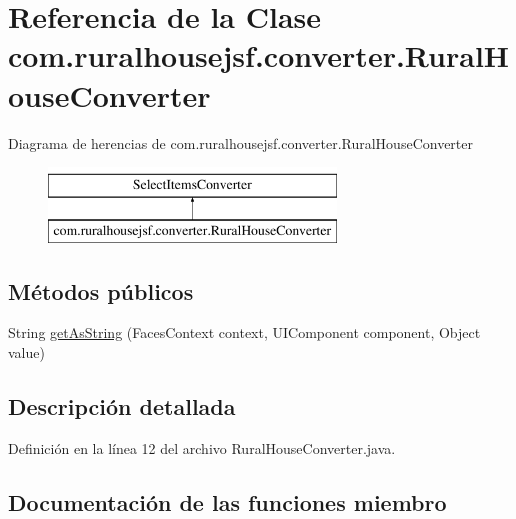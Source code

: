 \hypertarget{classcom_1_1ruralhousejsf_1_1converter_1_1_rural_house_converter}{}\section{Referencia de la Clase com.\+ruralhousejsf.\+converter.\+Rural\+House\+Converter}
\label{classcom_1_1ruralhousejsf_1_1converter_1_1_rural_house_converter}
Diagrama de herencias de com.\+ruralhousejsf.\+converter.\+Rural\+House\+Converter\begin{figure}[H]
\begin{center}
\leavevmode
\includegraphics[height=2.000000cm]{d7/d96/classcom_1_1ruralhousejsf_1_1converter_1_1_rural_house_converter}
\end{center}
\end{figure}
\subsection*{Métodos públicos}
\begin{DoxyCompactItemize}
\item 
String \mbox{\hyperlink{classcom_1_1ruralhousejsf_1_1converter_1_1_rural_house_converter_af5817e782563287dd8f10081cc24215d}{get\+As\+String}} (Faces\+Context context, U\+I\+Component component, Object value)
\end{DoxyCompactItemize}


\subsection{Descripción detallada}


Definición en la línea 12 del archivo Rural\+House\+Converter.\+java.



\subsection{Documentación de las funciones miembro}
\mbox{\label{classcom_1_1ruralhousejsf_1_1converter_1_1_rural_house_converter_af5817e782563287dd8f10081cc24215d}} 

